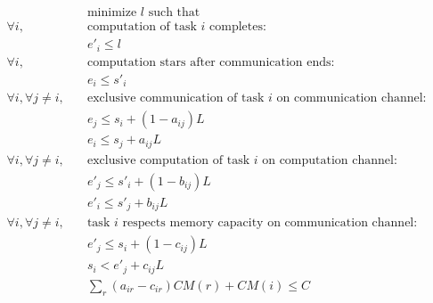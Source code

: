 \documentclass[sigconf]{acmart}
\begin{document}
	\vspace*{-0.5cm}
	\begin{align*}
		& \text{minimize } l \text{ such that }\\
		\forall i, \quad & \text{computation of task } i \text{ completes:}\\
		& e'_i \leq l\\
		\forall i, \quad & \text{computation stars after communication ends:}\\
		& e_i \leq s'_i\\
		\forall i, \forall j\ne i, \quad & \text{exclusive communication of task } i \text{ on communication channel:}\\
		& e_j \leq s_i +(1-a_{ij})L\\
		& e_i\leq s_j +a_{ij}L\\
		\forall i, \forall j\ne i, \quad & \text{exclusive computation of task } i \text{ on computation channel:}\\
		& e'_j \leq s'_i +(1-b_{ij})L\\
		& e'_i\leq s'_j +b_{ij}L\\
		\forall i, \forall j\ne i, \quad & \text{task } i \text{ respects memory capacity on communication channel:}\\
		& e'_j \leq s_i +(1-c_{ij})L\\
		& s_i< e'_j +c_{ij}L\\
		& \sum_r (a_{ir} - c_{ir})CM(r) + CM(i) \le C\\
	\end{align*} 
	
\end{document}
